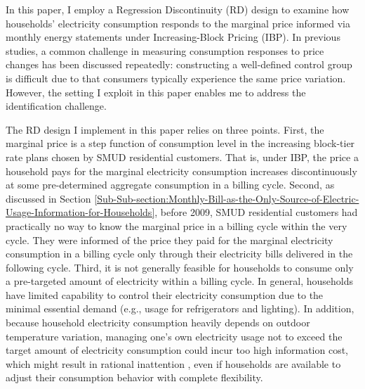 In this paper, I employ a Regression Discontinuity (RD) design to examine how households' electricity consumption responds to the marginal price informed via monthly energy statements under Increasing-Block Pricing (IBP). In previous studies, a common challenge in measuring consumption responses to price changes has been discussed repeatedly: constructing a well-defined control group is difficult due to that consumers typically experience the same price variation. However, the setting I exploit in this paper enables me to address the identification challenge.  

The RD design I implement in this paper relies on three points. First, the marginal price is a step function of consumption level in the increasing block-tier rate plans chosen by SMUD residential customers. That is, under IBP, the price a household pays for the marginal electricity consumption increases discontinuously at some pre-determined aggregate consumption in a billing cycle. Second, as discussed in Section \ref{Sub-Sub-section:Monthly-Bill-as-the-Only-Source-of-Electric-Usage-Information-for-Households}, before 2009, SMUD residential customers had practically no way to know the marginal price in a billing cycle within the very cycle. They were informed of the price they paid for the marginal electricity consumption in a billing cycle only through their electricity bills delivered in the following cycle. Third, it is not generally feasible for households to consume only a pre-targeted amount of electricity within a billing cycle. In general, households have limited capability to control their electricity consumption due to the minimal essential demand (e.g., usage for refrigerators and lighting). In addition, because household electricity consumption heavily depends on outdoor temperature variation, managing one's own electricity usage not to exceed the target amount of electricity consumption could incur too high information cost, which might result in rational inattention \citep{Rational-Inattention-and-Energy-Efficiency_Sallee_(2014)}, even if households are available to adjust their consumption behavior with complete flexibility. 

